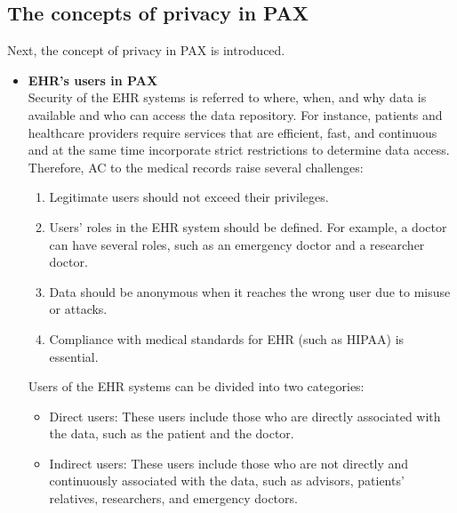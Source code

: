 \documentclass[journal,article,submit,moreauthors,pdftex]{Definitions/mdpi}
\begin{document}
\subsection{The concepts of privacy in PAX}
Next, the concept of privacy in PAX is introduced.
\begin{itemize}
\item \textbf{EHR's users in PAX}\\
Security of the EHR systems is referred to where, when, and why data is available and who can access the data repository. For instance, patients and healthcare providers require services that are efficient, fast, and continuous and at the same time incorporate strict restrictions to determine data access. Therefore, AC to the medical records raise several challenges:
\begin{enumerate}
\item Legitimate users should not exceed their privileges.
\item Users' roles in the EHR system should be defined. For example, a doctor can have several roles, such as an emergency doctor and a researcher doctor.
\item Data should be anonymous when it reaches the wrong user due to misuse or attacks.
\item Compliance with medical standards for EHR (such as HIPAA) is essential.
\end{enumerate}
Users of the EHR systems can be divided into two categories:
\begin{itemize}
\item Direct users: These users include those who are directly associated with the data, such as the patient and the doctor.
\item Indirect users: These users include those who are not directly and continuously associated with the data, such as advisors, patients' relatives, researchers, and emergency doctors.
\end{itemize}


\end{itemize}
\end{document}
